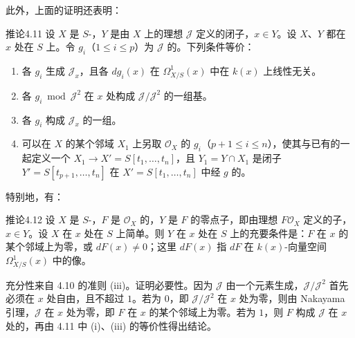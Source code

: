 此外，上面的证明还表明：
\begin{SGAresult}{推论}{4.11}
设 $X$ 是 $S$-，$Y$ 是由 $X$ 上的理想 $\mathcal J$ 定义的闭子，$x\in Y$。设 $X$、$Y$ 都在 $x$ 处在 $S$ 上。令 $g_i$（$1\leq i\leq p$）为 $\mathcal J$ 的。下列条件等价：
\begin{enumerate}
\item[(i)] 各 $g_i$ 生成 $\mathcal J_x$，且各 $dg_i(x)$ 在 $\Omega^1_{X/S}(x)$ 中在 $k(x)$ 上线性无关。
\item[(ii)] 各 $g_i\bmod\mathcal J^2$ 在 $x$ 处构成 $\mathcal J/\mathcal J^2$ 的一组基。
\item[(iii)] 各 $g_i$ 构成 $\mathcal J_x$ 的一组。
\item[(iv)] 可以在 $X$ 的某个邻域 $X_1$ 上另取 $\mathcal O_X$ 的 $g_i$（$p+1\leq i\leq n$），使其与已有的一起定义一个 $X_1\to X'=S[t_1,\ldots,t_n]$，且 $Y_1=Y\cap X_1$ 是闭子 $Y'=S[t_{p+1},\ldots,t_n]$ 在 $X'=S[t_1,\ldots,t_n]$ 中经 $g$ 的。
\end{enumerate}
\end{SGAresult}

特别地，有：
\begin{SGAresult}{推论}{4.12}
设 $X$ 是 $S$-，$F$ 是 $\mathcal O_X$ 的，$Y$ 是 $F$ 的零点子，即由理想 $F\mathcal O_X$ 定义的子，$x\in Y$。设 $X$ 在 $x$ 处在 $S$ 上简单。则 $Y$ 在 $x$ 处在 $S$ 上的充要条件是：$F$ 在 $x$ 的某个邻域上为零，或 $dF(x)\ne0$；这里 $dF(x)$ 指 $dF$ 在 $k(x)$-向量空间 $\Omega^1_{X/S}(x)$ 中的像。
\end{SGAresult}
充分性来自 4.10 的准则 (iii)。证明必要性。因为 $\mathcal J$ 由一个元素生成，$\mathcal J/\mathcal J^2$ 首先必须在 $x$ 处自由，且不超过 $1$。若为 $0$，即 $\mathcal J/\mathcal J^2$ 在 $x$ 处为零，则由 Nakayama 引理，$\mathcal J$ 在 $x$ 处为零，即 $F$ 在 $x$ 的某个邻域上为零。若为 $1$，则 $F$ 构成 $\mathcal J$ 在 $x$ 处的，再由 4.11 中 (i)、(iii) 的等价性得出结论。

